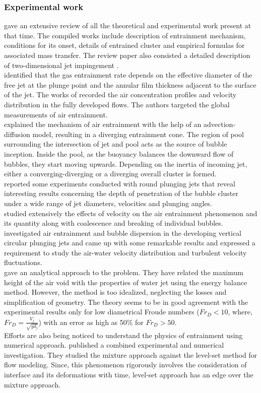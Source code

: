 \subsubsection{Experimental work}
\citet{Bin1993} gave an extensive review of all the theoretical and experimental work present at that time. The compiled works include description of entrainment mechanism, conditions for its onset, details of entrained cluster and empirical formulas for associated mass transfer. The review paper also consisted a detailed description of two-dimensional jet impingement \citep{sene1988air, Goldring1980}.\\
\citet{Evans1996} identified that the gas entrainment rate depends on the effective diameter of the free jet at the plunge point and the annular film thickness adjacent to the surface of the jet. The works of \citet{Mckeogh1981,Van1981,el2002} recorded the air concentration profiles and velocity distribution in the fully developed flows. The authors targeted the global measurements of air entrainment.\\
\citet{Chanson1996} explained the mechanism of air entrainment with the help of an advection-diffusion model, resulting in a diverging entrainment cone. The region of pool surrounding the intersection of jet and pool acts as the source of bubble inception. Inside the pool, as the buoyancy balances the downward flow of bubbles, they start moving upwards. Depending on the inertia of incoming jet, either a converging-diverging or a diverging overall cluster is formed.\\
\citet{Clanet1997} reported some experiments conducted with round plunging jets that reveal interesting results concerning the depth of penetration of the bubble cluster under a wide range of jet diameters, velocities and plunging angles.\\
\citet{Cummings1999} studied extensively the effects of velocity on the air entrainment phenomenon and its quantity along with coalescence and breaking of individual bubbles.\\
\citet{Chanson2004} investigated air entrainment and bubble dispersion in the developing vertical circular plunging jets and came up with some remarkable results and expressed a requirement to study the air-water velocity distribution and turbulent velocity fluctuations.\\
\citet{Soh2005} gave an analytical approach to the problem. They have related the maximum height of the air void with the properties of water jet using the energy balance method. However, the method is too idealized, neglecting the losses and simplification of geometry. The theory seems to be in good agreement with the experimental results only for low diametrical Froude numbers ($ Fr_D < 10 $, where, $Fr_D = \frac{V_j}{\sqrt{gd_j}}$) with an error as high as 50\% for $ Fr_D > 50 $.\\
Efforts are also being noticed to understand the physics of entrainment using numerical approach. \citet{Qu2011} published a combined experimental and numerical investigation. They studied the mixture approach against the level-set method for flow modeling. Since, this phenomenon rigorously involves the consideration of interface and its deformations with time, level-set approach has an edge over the mixture approach.

